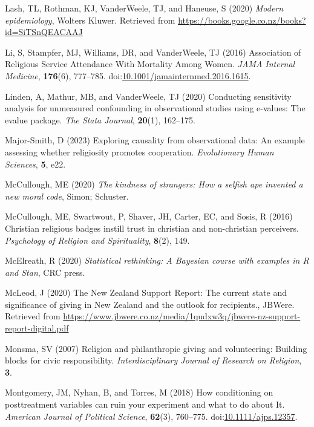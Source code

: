 \documentclass[
  single column]{article}
\newlength{\cslhangindent}
\newenvironment{CSLReferences}[2] %
 {\begin{list}{}{%
  \setlength{\itemindent}{0pt}
  \setlength{\leftmargin}{0pt}
  \setlength{\parsep}{0pt}
  \ifodd #1
   \setlength{\leftmargin}{\cslhangindent}
   \setlength{\itemindent}{-1\cslhangindent}
  \fi
  \setlength{\itemsep}{#2\baselineskip}}}
 {\end{list}}
\begin{document}
\begin{CSLReferences}{1}{0}
Lash, TL, Rothman, KJ, VanderWeele, TJ, and Haneuse, S (2020)
\emph{Modern epidemiology}, Wolters Kluwer. Retrieved from
\url{https://books.google.co.nz/books?id=SiTSnQEACAAJ}

Li, S, Stampfer, MJ, Williams, DR, and VanderWeele, TJ (2016)
{Association of Religious Service Attendance With Mortality Among
Women}. \emph{JAMA Internal Medicine}, \textbf{176}(6), 777--785.
doi:\href{https://doi.org/10.1001/jamainternmed.2016.1615}{10.1001/jamainternmed.2016.1615}.

Linden, A, Mathur, MB, and VanderWeele, TJ (2020) Conducting sensitivity
analysis for unmeasured confounding in observational studies using
e-values: The evalue package. \emph{The Stata Journal}, \textbf{20}(1),
162--175.

Major-Smith, D (2023) Exploring causality from observational data: An
example assessing whether religiosity promotes cooperation.
\emph{Evolutionary Human Sciences}, \textbf{5}, e22.

McCullough, ME (2020) \emph{The kindness of strangers: How a selfish ape
invented a new moral code}, Simon; Schuster.

McCullough, ME, Swartwout, P, Shaver, JH, Carter, EC, and Sosis, R
(2016) Christian religious badges instill trust in christian and
non-christian perceivers. \emph{Psychology of Religion and
Spirituality}, \textbf{8}(2), 149.

McElreath, R (2020) \emph{Statistical rethinking: A {B}ayesian course
with examples in {R} and {S}tan}, CRC press.

McLeod, J (2020) The {N}ew {Z}ealand {S}upport {R}eport: The current
state and significance of giving in {N}ew {Z}ealand and the outlook for
recipients., JBWere. Retrieved from
\url{https://www.jbwere.co.nz/media/1qudxw3q/jbwere-nz-support-report-digital.pdf}

Monsma, SV (2007) Religion and philanthropic giving and volunteering:
Building blocks for civic responsibility. \emph{Interdisciplinary
Journal of Research on Religion}, \textbf{3}.

Montgomery, JM, Nyhan, B, and Torres, M (2018) How conditioning on
posttreatment variables can ruin your experiment and what to do about
It. \emph{American Journal of Political Science}, \textbf{62}(3),
760--775.
doi:\href{https://doi.org/10.1111/ajps.12357}{10.1111/ajps.12357}.


\end{CSLReferences}
\end{document}
